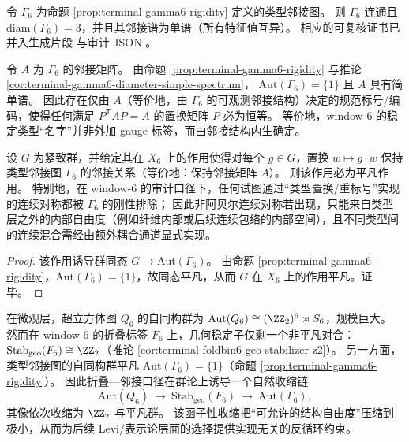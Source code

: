 \begin{corollary}\label{cor:terminal-gamma6-diameter-simple-spectrum}
令 \(\Gamma_6\) 为命题 \ref{prop:terminal-gamma6-rigidity} 定义的类型邻接图。
则 \(\Gamma_6\) 连通且 \(\mathrm{diam}(\Gamma_6)=3\)，并且其邻接谱为单谱（所有特征值互异）。
相应的可复核证书已并入生成片段 \texttt{} 与审计 JSON \texttt{}。
\end{corollary}

\begin{corollary}\label{cor:terminal-gamma6-canonical-addressing}
令 \(A\) 为 \(\Gamma_6\) 的邻接矩阵。
由命题 \ref{prop:terminal-gamma6-rigidity} 与推论 \ref{cor:terminal-gamma6-diameter-simple-spectrum}，
\(\mathrm{Aut}(\Gamma_6)=\{1\}\) 且 \(A\) 具有简单谱。
因此存在仅由 \(A\)（等价地，由 \(\Gamma_6\) 的可观测邻接结构）决定的规范标号/编码，使得任何满足
\(
P^{\mathsf T}AP=A
\)
的置换矩阵 \(P\) 必为恒等。
等价地，window-\(6\) 的稳定类型“名字”并非外加 gauge 标签，而由邻接结构内生确定。
\end{corollary}

\begin{corollary}\label{cor:terminal-gamma6-no-continuous-nonabelian-symmetry}
设 \(G\) 为紧致群，并给定其在 \(X_6\) 上的作用使得对每个 \(g\in G\)，置换 \(w\mapsto g\cdot w\) 保持类型邻接图 \(\Gamma_6\) 的邻接关系（等价地：保持邻接矩阵 \(A\)）。
则该作用必为平凡作用。
特别地，在 window-\(6\) 的审计口径下，任何试图通过“类型置换/重标号”实现的连续对称都被 \(\Gamma_6\) 的刚性排除；
因此非阿贝尔连续对称若出现，只能来自类型层之外的内部自由度（例如纤维内部或后续连续包络的内部空间），且不同类型间的连续混合需经由额外耦合通道显式实现。
\end{corollary}
\begin{proof}
该作用诱导群同态 \(G\to \mathrm{Aut}(\Gamma_6)\)。
由命题 \ref{prop:terminal-gamma6-rigidity}，\(\mathrm{Aut}(\Gamma_6)=\{1\}\)，故同态平凡，从而 \(G\) 在 \(X_6\) 上的作用平凡。证毕。
\end{proof}

\begin{remark}\label{rem:terminal-window6-symmetry-breaking-functor}
在微观层，超立方体图 \(Q_6\) 的自同构群为 \(\mathrm{Aut}(Q_6)\cong(\ZZ_2)^6\rtimes S_6\)，规模巨大。
然而在 window-\(6\) 的折叠标签 \(F_6\) 上，几何稳定子仅剩一个非平凡对合：
\(\mathrm{Stab}_{\mathrm{geo}}(F_6)\cong \ZZ_2\)（推论 \ref{cor:terminal-foldbin6-geo-stabilizer-z2}）。
另一方面，类型邻接图的自同构群平凡 \(\mathrm{Aut}(\Gamma_6)=\{1\}\)（命题 \ref{prop:terminal-gamma6-rigidity}）。
因此折叠—邻接口径在群论上诱导一个自然收缩链
\[
\mathrm{Aut}(Q_6)\ \longrightarrow\ \mathrm{Stab}_{\mathrm{geo}}(F_6)\ \longrightarrow\ \mathrm{Aut}(\Gamma_6),
\]
其像依次收缩为 \(\ZZ_2\) 与平凡群。
该函子性收缩把“可允许的结构自由度”压缩到极小，从而为后续 Levi/表示论层面的选择提供实现无关的反循环约束。
\end{remark}


